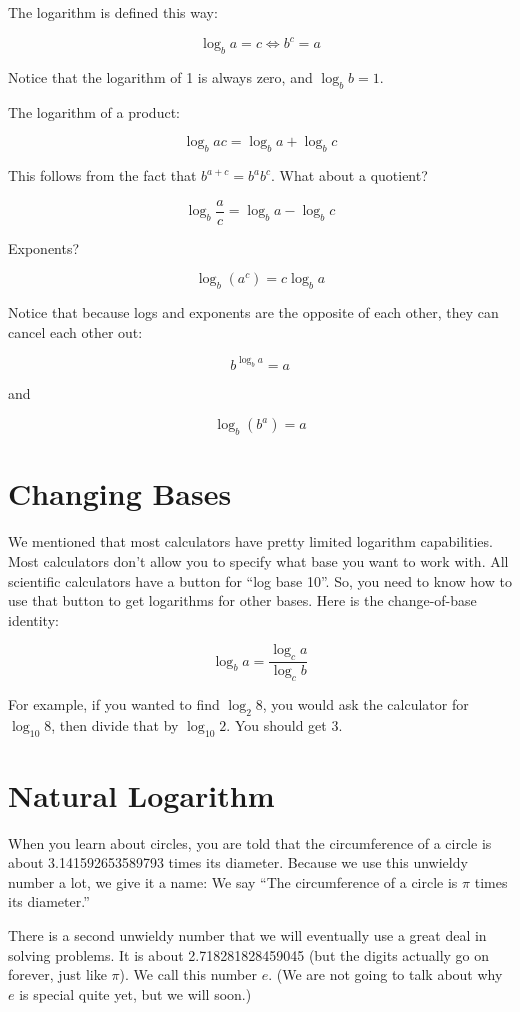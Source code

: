 The logarithm is defined this way:

$$\log_b a = c \iff b^c = a$$

Notice that the logarithm of 1 is always zero, and $\log_b b = 1$.

The logarithm of a product:

$$\log_b a c = \log_b a + \log_b c$$

This follows from the fact that $b^{a + c} = b^a b^c$. What about a quotient?

$$\log_b \frac{a}{c} = \log_b a - \log_b c$$

Exponents?

$$\log_b \left(a^c\right) = c \log_b a$$

Notice that because logs and exponents are the opposite of each other, they can cancel each other out:

$$b^{\log_b a} = a$$

and

$$\log_b \left(b^a\right) = a$$

\section{Changing Bases}

We mentioned that most calculators have pretty limited logarithm
capabilities. Most calculators don't allow you to specify what base
you want to work with. All scientific calculators have a button for
``log base 10''.  So, you need to know how to use that button to get
logarithms for other bases. Here is the change-of-base identity:

$$\log_b a = \frac {\log_c a}{\log_c b}$$

For example, if you wanted to find $\log_2 8$, you would ask the
calculator for $\log_{10} 8$, then divide that by $\log_{10} 2$.
You should get 3.

\section{Natural Logarithm}

When you learn about circles, you are told that the circumference of a
circle is about 3.141592653589793 times its diameter.  Because we use
this unwieldy number a lot, we give it a name: We say ``The
circumference of a circle is $\pi$ times its diameter.''

There is a second unwieldy number that we will eventually use a great deal in
solving problems. It is about 2.718281828459045 (but the digits
actually go on forever, just like $\pi$). We call this number $e$. (We are
not going to talk about why $e$ is special quite yet, but we will soon.)

